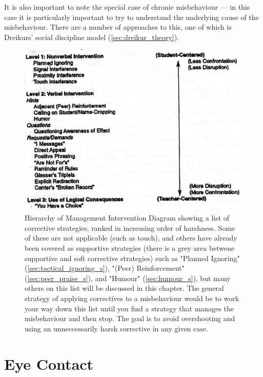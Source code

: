 \documentclass[12pt]{report}
\begin{document}
It is also important to note the special case of chronic misbehaviour --- in this case it is particularly important to try to understand the underlying cause of the misbehaviour. There are a number of approaches to this, one of which is Dreikurs' social discipline model (\ref{sec:dreikur_theory}).


\begin{figure}[p]
\begin{center}
\includegraphics{./images/correctiveHierarchy.jpg}
\end{center}
\caption{Hierarchy of Management Intervention Diagram \cite{Levin2005} showing a list of corrective strategies, ranked in increasing order of harshness. Some of these are not applicable (such as touch), and others have already been covered as supportive strategies (there is a grey area betwene supportive and soft corrective strategies) such as "Planned Ignoring" (\ref{sec:tactical_ignoring_s}), "(Peer) Reinforcement" (\ref{sec:peer_praise_s}), and "Humour" (\ref{sec:humour_s}), but many others on this list will be discussed in this chapter. The general strategy of applying correctives to a misbehaviour would be to work your way down this list until you find a strategy that manages the misbehaviour and then stop. The goal is to avoid overshooting and using an unneccessarily harsh corrective in any given case. \label{fig:correctiveHierarchy}}
\end{figure}


\section{Eye Contact}
\label{sec:eye_contact_c}
\end{document}
